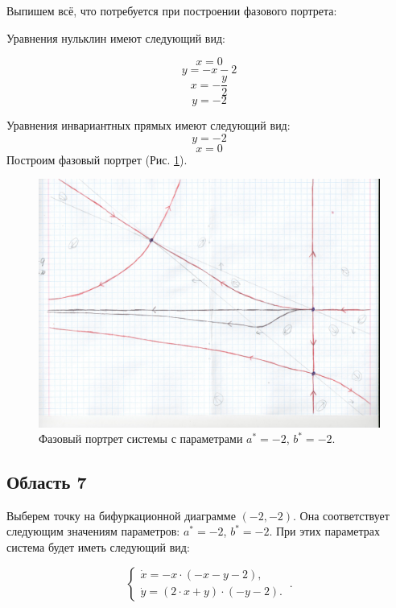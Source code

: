 Выпишем всё, что потребуется при построении фазового портрета:

Уравнения нульклин имеют следующий вид: 

$$x=0$$
$$y=- x - 2$$
$$x=- \frac{y}{2}$$
$$y=-2$$


Уравнения инвариантных прямых имеют следующий вид: 
$$y = -2$$
$$x = 0$$
Построим фазовый портрет (Рис. \ref{fig:phportr6}).

\begin{figure}[h]
	
	\includegraphics[width=\textwidth]{phptr/(-2, -2) транскритическая.jpg}
	\centering
	\caption{\label{fig:phportr6} Фазовый портрет системы с параметрами $a^\ast = -2$, $b^\ast = -2$.}
	
\end{figure}

\subsection{Область 7}

Выберем точку на бифуркационной диаграмме $(-2, -2)$. Она соответствует следующим значениям параметров:  $a^\ast = -2$, $b^\ast = -2$. При этих параметрах система будет иметь следующий вид: 

$$
\left \lbrace 
\begin{matrix} 
	\dot{x} = -x \cdot (-x - y - 2), \\
	\dot{y} = (2 \cdot x + y) \cdot (-y - 2). \
\end{matrix} 
\right . .$$

